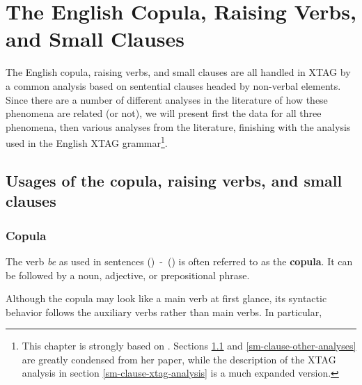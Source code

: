 \section{The English Copula, Raising Verbs, and Small Clauses}

The English copula, raising verbs, and small clauses are all handled in XTAG by
a common analysis based on sentential clauses headed by non-verbal elements.
Since there are a number of different analyses in the literature of how these
phenomena are related (or not), we will present first the data for all three
phenomena, then various analyses from the literature, finishing with the
analysis used in the English XTAG grammar\footnote{This chapter is strongly
based on \cite{heycock91}.  Sections \ref{sm-clause-data} and
\ref{sm-clause-other-analyses} are greatly condensed from her paper, while the 
description of the XTAG analysis in section \ref{sm-clause-xtag-analysis} is a
much expanded version.}.


\subsection{Usages of the copula, raising verbs, and small clauses}
\label{sm-clause-data}

\subsubsection{Copula}
\label{copula-data}

The verb {\it be} as used in sentences ({})~-~({}) is often
referred to as the {\bf copula}.  It can be followed by a noun, adjective, or
prepositional phrase.


Although the copula may look like a main verb at first glance, its syntactic
behavior follows the auxiliary verbs rather than main verbs.  In particular,

